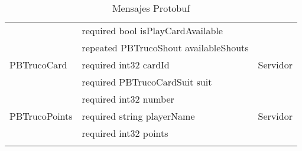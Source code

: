 \begin{longtable}{|l|l|l|}
                    & required bool isPlayCardAvailable & \\
                    & repeated PBTrucoShout availableShouts & \\
    \hline
    PBTrucoCard & required int32 cardId & Servidor \\
                & required PBTrucoCardSuit suit & \\
                & required int32 number & \\
    \hline
    PBTrucoPoints & required string playerName & Servidor \\
                    & required int32 points & \\
    \hline

    \caption{Mensajes Protobuf}\\    
\end{longtable}

